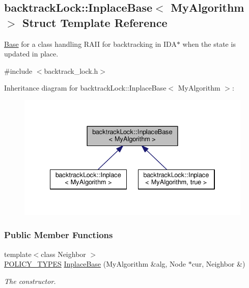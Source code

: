 \hypertarget{structbacktrackLock_1_1InplaceBase}{}\subsection{backtrack\+Lock\+:\+:Inplace\+Base$<$ My\+Algorithm $>$ Struct Template Reference}
\label{structbacktrackLock_1_1InplaceBase}


\hyperlink{structBase}{Base} for a class handling R\+A\+II for backtracking in I\+D\+A$\ast$ when the state is updated in place.  




{\ttfamily \#include $<$backtrack\+\_\+lock.\+h$>$}



Inheritance diagram for backtrack\+Lock\+:\+:Inplace\+Base$<$ My\+Algorithm $>$\+:\nopagebreak
\begin{figure}[H]
\begin{center}
\leavevmode
\includegraphics[width=334pt]{structbacktrackLock_1_1InplaceBase__inherit__graph}
\end{center}
\end{figure}
\subsubsection*{Public Member Functions}
\begin{DoxyCompactItemize}
\item 
{\footnotesize template$<$class Neighbor $>$ }\\\hyperlink{extensions_2shared__policies_2headers_8h_ae70a06fa4631780beea14971eb36a562}{P\+O\+L\+I\+C\+Y\+\_\+\+T\+Y\+P\+ES} \hyperlink{structbacktrackLock_1_1InplaceBase_ae7604de3a75a39b8a13e4ea3247b2072}{Inplace\+Base} (My\+Algorithm \&alg, Node $\ast$cur, Neighbor \&)
\begin{DoxyCompactList}\small\item\em The constructor. \end{DoxyCompactList}\end{DoxyCompactItemize}

